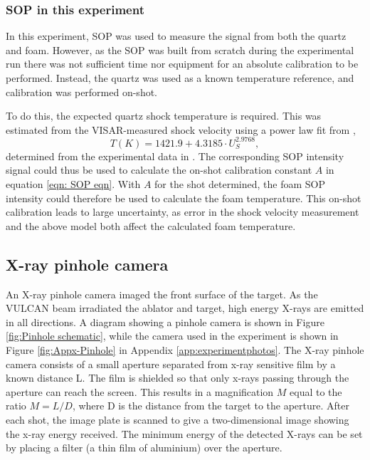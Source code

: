 \subsubsection{SOP in this experiment}

In this experiment, SOP was used to measure the signal from both the quartz and foam. However, as the SOP was built from scratch during the experimental run there was not sufficient time nor equipment for an absolute calibration to be performed. Instead, the quartz was used as a known temperature reference, and calibration was performed on-shot.

To do this, the expected quartz shock temperature is required. This was estimated from the VISAR-measured shock velocity using a power law fit from \cite{Millot2015}, \begin{equation} T(K) = 1421.9 + 4.3185 \cdot U_S^{2.9768}, \label{eqn:Temp fit} \end{equation} determined from the experimental data in \cite{Hicks2006}. The corresponding SOP intensity signal could thus be used to calculate the on-shot calibration constant $A$ in equation \ref{eqn: SOP eqn}. With $A$ for the shot determined, the foam SOP intensity could therefore be used to calculate the foam temperature. This on-shot calibration leads to large uncertainty, as error in the shock velocity measurement and the above model both affect the calculated foam temperature.

\subsection{X-ray pinhole camera}
An X-ray pinhole camera imaged the front surface of the target. As the VULCAN beam irradiated the ablator and target, high energy X-rays are emitted in all directions. A diagram showing a pinhole camera is shown in Figure \ref{fig:Pinhole schematic}, while the camera used in the experiment is shown in Figure \ref{fig:Appx-Pinhole} in Appendix \ref{app:experimentphotos}. The X-ray pinhole camera consists of a small aperture separated from x-ray sensitive film by a known distance L. The film is shielded so that only x-rays passing through the aperture can reach the screen. This results in a magnification $M$ equal to the ratio $M = L/D$, where D is the distance from the target to the aperture. After each shot, the image plate is scanned to give a two-dimensional image showing the x-ray energy received. The minimum energy of the detected X-rays can be set by placing a filter (a thin film of aluminium) over the aperture.

